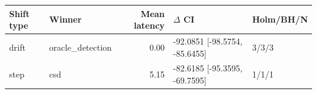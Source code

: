 \begin{tabular}{llrll}
\toprule
Shift type & Winner & Mean latency & $\Delta$ CI & Holm/BH/N \\
\midrule
drift & oracle\_detection & 0.00 & -92.0851 [-98.5754, -85.6455] & 3/3/3 \\
step & csd & 5.15 & -82.6185 [-95.3595, -69.7595] & 1/1/1 \\
\bottomrule
\end{tabular}
